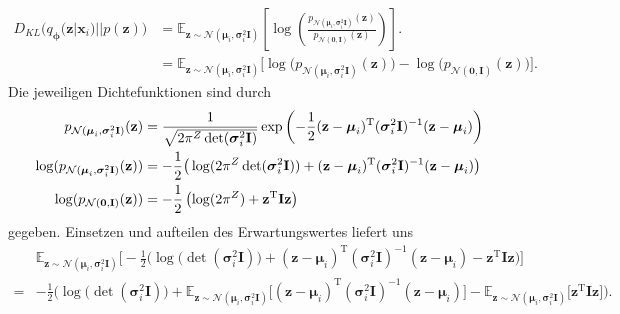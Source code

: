 \documentclass[12pt]{article}
\newcommand{\z}{\mathbf{z}}
\begin{document}
	\begin{align*}
	D_{KL}\big(q_{\boldsymbol\phi}(\textbf{z}|\textbf{x}_{i}) || p(\textbf{z})\big) &= \mathbb{E}_{\z\sim\mathcal{N}(\boldsymbol\mu_{i},\boldsymbol\sigma_{i}^{2}\mathbf{I})}\left[\log\left(\frac{p_{\mathcal{N}(\boldsymbol\mu_{i},\boldsymbol\sigma_{i}^{2}\mathbf{I})}(\textbf{z})}{p_{\mathcal{N}(\mathbf{0},\mathbf{I})}(\textbf{z})}\right)\right].\\
	&= \mathbb{E}_{\z\sim\mathcal{N}(\boldsymbol\mu_{i},\boldsymbol\sigma_{i}^{2}\mathbf{I})}\big[\log\big(p_{\mathcal{N}(\boldsymbol\mu_{i},\boldsymbol\sigma_{i}^{2}\mathbf{I})}(\textbf{z})\big)
	- \log\big(p_{\mathcal{N}(\mathbf{0},\mathbf{I})}(\textbf{z})\big)\big].
	\end{align*}
	Die jeweiligen Dichtefunktionen sind durch
	\begin{align*}
	p_{\mathcal{N}(\boldsymbol\mu_{i},\boldsymbol\sigma_{i}^{2}\mathbf{I})}(\textbf{z})&= \frac{1}{\sqrt{2\pi^{Z} \det(\boldsymbol\sigma_{i}^{2}\mathbf{I})}}\exp\left(-\frac{1}{2}(\textbf{z}-\boldsymbol\mu_{i})^{\mathrm{T}}(\boldsymbol\sigma_{i}^{2}\mathbf{I})^{-1}(\textbf{z}-\boldsymbol\mu_{i})\right) \notag \\
	\log(p_{\mathcal{N}(\boldsymbol\mu_{i},\boldsymbol\sigma_{i}^{2}\mathbf{I})}(\textbf{z}))&= -\frac{1}{2}\big(\log(2\pi^{Z} \det(\boldsymbol\sigma_{i}^{2}\mathbf{I}))+(\textbf{z}-\boldsymbol\mu_{i})^{\mathrm{T}}(\boldsymbol\sigma_{i}^{2}\mathbf{I})^{-1}(\textbf{z}-\boldsymbol\mu_{i})\big)\\ \notag
	\log(p_{\mathcal{N}(\mathbf{0},\mathbf{I})}(\textbf{z}))&= -\frac{1}{2}\left(\log(2\pi^{Z} )+\textbf{z}^{\mathrm{T}}\mathbf{I}\textbf{z}\right)
	\end{align*}
	gegeben. Einsetzen und aufteilen des Erwartungswertes liefert uns
	\begin{align*}
	&\mathbb{E}_{\z\sim\mathcal{N}(\boldsymbol\mu_{i},\boldsymbol\sigma_{i}^{2}\mathbf{I})}\Big[-\frac{1}{2}\Big(\log\big(\det(\boldsymbol\sigma_{i}^{2}\mathbf{I})\big)+(\textbf{z}-\boldsymbol\mu_{i})^{\mathrm{T}}(\boldsymbol\sigma_{i}^{2}\mathbf{I})^{-1}(\textbf{z}-\boldsymbol\mu_{i})-\textbf{z}^{\mathrm{T}}\mathbf{I}\textbf{z}\Big)\Big]\\
	=
	&-\frac{1}{2}\Big(\log\big(\det(\boldsymbol\sigma_{i}^{2}\mathbf{I})\big)+\mathbb{E}_{\z\sim\mathcal{N}(\boldsymbol\mu_{i},\boldsymbol\sigma_{i}^{2}\mathbf{I})}\big[(\textbf{z}-\boldsymbol\mu_{i})^{\mathrm{T}}(\boldsymbol\sigma_{i}^{2}\mathbf{I})^{-1}(\textbf{z}-\boldsymbol\mu_{i})\big]-\mathbb{E}_{\z\sim\mathcal{N}(\boldsymbol\mu_{i},\boldsymbol\sigma_{i}^{2}\mathbf{I})}\big[\textbf{z}^{\mathrm{T}}\mathbf{I}\textbf{z}\big]\Big).
	\end{align*}
\end{document}
